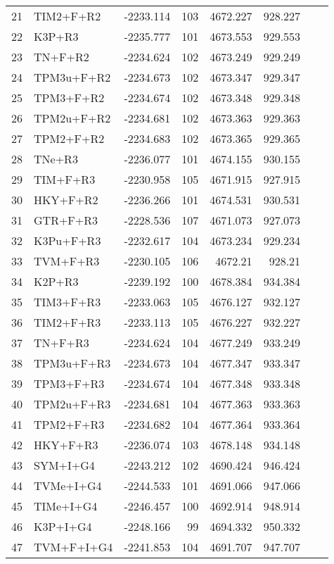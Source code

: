\begin{longtable}{clrrrrrr}
	21 & TIM2+F+R2 & -2233.114 & 103 & 4672.227 & 928.227 \\ 
	22 & K3P+R3 & -2235.777 & 101 & 4673.553 & 929.553 \\ 
	23 & TN+F+R2 & -2234.624 & 102 & 4673.249 & 929.249 \\ 
	24 & TPM3u+F+R2 & -2234.673 & 102 & 4673.347 & 929.347 \\ 
	25 & TPM3+F+R2 & -2234.674 & 102 & 4673.348 & 929.348 \\ 
	26 & TPM2u+F+R2 & -2234.681 & 102 & 4673.363 & 929.363 \\ 
	27 & TPM2+F+R2 & -2234.683 & 102 & 4673.365 & 929.365 \\ 
	28 & TNe+R3 & -2236.077 & 101 & 4674.155 & 930.155 \\ 
	29 & TIM+F+R3 & -2230.958 & 105 & 4671.915 & 927.915 \\ 
	30 & HKY+F+R2 & -2236.266 & 101 & 4674.531 & 930.531 \\ 
	31 & GTR+F+R3 & -2228.536 & 107 & 4671.073 & 927.073 \\ 
	32 & K3Pu+F+R3 & -2232.617 & 104 & 4673.234 & 929.234 \\ 
	33 & TVM+F+R3 & -2230.105 & 106 & 4672.21 & 928.21 \\ 
	34 & K2P+R3 & -2239.192 & 100 & 4678.384 & 934.384 \\ 
	35 & TIM3+F+R3 & -2233.063 & 105 & 4676.127 & 932.127 \\ 
	36 & TIM2+F+R3 & -2233.113 & 105 & 4676.227 & 932.227 \\ 
	37 & TN+F+R3 & -2234.624 & 104 & 4677.249 & 933.249 \\ 
	38 & TPM3u+F+R3 & -2234.673 & 104 & 4677.347 & 933.347 \\ 
	39 & TPM3+F+R3 & -2234.674 & 104 & 4677.348 & 933.348 \\ 
	40 & TPM2u+F+R3 & -2234.681 & 104 & 4677.363 & 933.363 \\ 
	41 & TPM2+F+R3 & -2234.682 & 104 & 4677.364 & 933.364 \\ 
	42 & HKY+F+R3 & -2236.074 & 103 & 4678.148 & 934.148 \\ 
	43 & SYM+I+G4 & -2243.212 & 102 & 4690.424 & 946.424 \\ 
	44 & TVMe+I+G4 & -2244.533 & 101 & 4691.066 & 947.066 \\ 
	45 & TIMe+I+G4 & -2246.457 & 100 & 4692.914 & 948.914 \\ 
	46 & K3P+I+G4 & -2248.166 & 99 & 4694.332 & 950.332 \\ 
	47 & TVM+F+I+G4 & -2241.853 & 104 & 4691.707 & 947.707 \\ 

\end{longtable}
